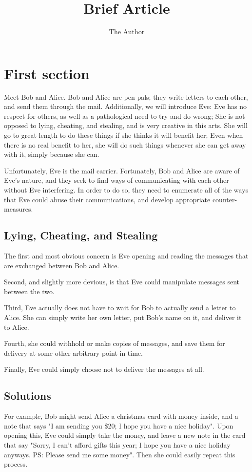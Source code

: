 \documentclass[11pt]{article} %
\title{Brief Article}
\author{The Author}
\begin{document}
\maketitle

\section{First section}

Meet Bob and Alice. Bob and Alice are pen pals; they write letters to each other, and send them through the mail. Additionally, we will introduce Eve:  Eve has no respect for others, as well as a pathological need to try and do wrong; She is not opposed to lying, cheating, and stealing, and is very creative in this arts. She will go to great length to do these things if she thinks it will benefit her; Even when there is no real benefit to her, she will do such things whenever she can get away with it, simply because she can.

Unfortunately, Eve is the mail carrier. Fortunately, Bob and Alice are aware of Eve's nature, and they seek to find ways of communicating with each other without Eve interfering. In order to do so, they need to enumerate all of the ways that Eve could abuse their communications, and develop appropriate counter-measures.

\subsection{Lying, Cheating, and Stealing}

The first and most obvious concern is Eve opening and reading the messages that are exchanged between Bob and Alice.

Second, and slightly more devious, is that Eve could manipulate messages sent between the two.

Third, Eve actually does not have to wait for Bob to actually send a letter to Alice. She can simply write her own letter, put Bob's name on it, and deliver it to Alice.

Fourth, she could withhold or make copies of messages, and save them for delivery at some other arbitrary point in time.

Finally, Eve could simply choose not to deliver the messages at all.

\subsection{Solutions}




For example, Bob might send Alice a christmas card with money inside, and a note that says "I am sending you \$20; I hope you have a nice holiday". Upon opening this, Eve could simply take the money, and leave a new note in the card that say "Sorry, I can't afford gifts this year; I hope you have a nice holiday anyways. PS: Please send me some money". Then she could easily repeat this process.
\end{document}
